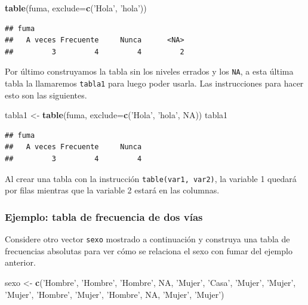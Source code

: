 \documentclass[10pt,]{krantz}
\makeatletter
\newenvironment{Shaded}{\begin{snugshade}}{\end{snugshade}}
\newcommand{\KeywordTok}[1]{\textcolor[rgb]{0.13,0.29,0.53}{\textbf{#1}}}
\newcommand{\DataTypeTok}[1]{\textcolor[rgb]{0.13,0.29,0.53}{#1}}
\newcommand{\StringTok}[1]{\textcolor[rgb]{0.31,0.60,0.02}{#1}}
\newcommand{\OtherTok}[1]{\textcolor[rgb]{0.56,0.35,0.01}{#1}}
\newcommand{\NormalTok}[1]{#1}
\newenvironment{kframe}{%
\medskip{}
\setlength{\fboxsep}{.8em}
 \def\at@end@of@kframe{}%
 \ifinner\ifhmode%
  \def\at@end@of@kframe{\end{minipage}}%
  \begin{minipage}{\columnwidth}%
 \fi\fi%
 \def\FrameCommand##1{\hskip\@totalleftmargin \hskip-\fboxsep
 \colorbox{shadecolor}{##1}\hskip-\fboxsep
     \hskip-\linewidth \hskip-\@totalleftmargin \hskip\columnwidth}%
 \MakeFramed {\advance\hsize-\width
   \@totalleftmargin\z@ \linewidth\hsize
   \@setminipage}}%
 {\par\unskip\endMakeFramed%
 \at@end@of@kframe}
\renewenvironment{Shaded}{\begin{kframe}}{\end{kframe}}
\let\BeginKnitrBlock\begin \let\EndKnitrBlock\end
\makeatother
\begin{document}
\begin{Shaded}
\begin{Highlighting}[]
\KeywordTok{table}\NormalTok{(fuma, }\DataTypeTok{exclude=}\KeywordTok{c}\NormalTok{(}\StringTok{'Hola'}\NormalTok{, }\StringTok{'hola'}\NormalTok{))}
\end{Highlighting}
\end{Shaded}

\begin{verbatim}
## fuma
##   A veces Frecuente     Nunca      <NA> 
##         3         4         4         2
\end{verbatim}

Por último construyamos la tabla sin los niveles errados y los
\texttt{NA}, a esta última tabla la llamaremos \texttt{tabla1} para
luego poder usarla. Las instrucciones para hacer esto son las
siguientes.

\begin{Shaded}
\begin{Highlighting}[]
\NormalTok{tabla1 <-}\StringTok{ }\KeywordTok{table}\NormalTok{(fuma, }\DataTypeTok{exclude=}\KeywordTok{c}\NormalTok{(}\StringTok{'Hola'}\NormalTok{, }\StringTok{'hola'}\NormalTok{, }\OtherTok{NA}\NormalTok{))}
\NormalTok{tabla1}
\end{Highlighting}
\end{Shaded}

\begin{verbatim}
## fuma
##   A veces Frecuente     Nunca 
##         3         4         4
\end{verbatim}

\BeginKnitrBlock{rmdnote}
Al crear una tabla con la instrucción \texttt{table(var1,\ var2)}, la
variable 1 quedará por filas mientras que la variable 2 estará en las
columnas.
\EndKnitrBlock{rmdnote}

\subsubsection*{Ejemplo: tabla de frecuencia de dos
vías}\label{ejemplo-tabla-de-frecuencia-de-dos-vias}

Considere otro vector \texttt{sexo} mostrado a continuación y construya
una tabla de frecuencias absolutas para ver cómo se relaciona el sexo
con fumar del ejemplo anterior.

\begin{Shaded}
\begin{Highlighting}[]
\NormalTok{sexo <-}\StringTok{ }\KeywordTok{c}\NormalTok{(}\StringTok{'Hombre'}\NormalTok{, }\StringTok{'Hombre'}\NormalTok{, }\StringTok{'Hombre'}\NormalTok{, }\OtherTok{NA}\NormalTok{, }\StringTok{'Mujer'}\NormalTok{,}
          \StringTok{'Casa'}\NormalTok{, }\StringTok{'Mujer'}\NormalTok{, }\StringTok{'Mujer'}\NormalTok{, }\StringTok{'Mujer'}\NormalTok{, }\StringTok{'Hombre'}\NormalTok{, }\StringTok{'Mujer'}\NormalTok{, }
          \StringTok{'Hombre'}\NormalTok{, }\OtherTok{NA}\NormalTok{, }\StringTok{'Mujer'}\NormalTok{, }\StringTok{'Mujer'}\NormalTok{)}
\end{Highlighting}
\end{Shaded}
\end{document}
